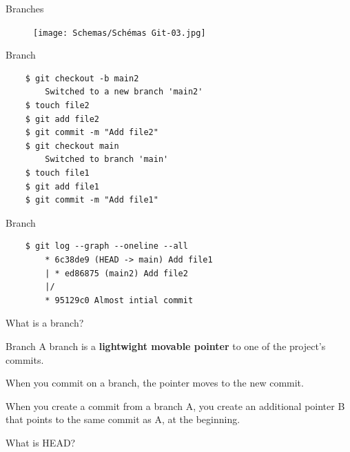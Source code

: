 \documentclass[10pt,aspectratio=169]{beamer}
\begin{document}
\begin{frame}[fragile]{Branches}
    \begin{figure}
        \texttt{[image: Schemas/Schémas Git-03.jpg]}
    \end{figure}
\end{frame}

\begin{frame}[fragile]{Branch}
    \begin{verbatim}
    $ git checkout -b main2
        Switched to a new branch 'main2'
    $ touch file2
    $ git add file2
    $ git commit -m "Add file2"
    $ git checkout main
        Switched to branch 'main'
    $ touch file1
    $ git add file1
    $ git commit -m "Add file1"
    \end{verbatim}
\end{frame}

\begin{frame}[fragile]{Branch}
    \begin{verbatim}
    $ git log --graph --oneline --all
        * 6c38de9 (HEAD -> main) Add file1
        | * ed86875 (main2) Add file2
        |/
        * 95129c0 Almost intial commit
    \end{verbatim}
\end{frame}


{
\begin{frame}
    What is a branch?
\end{frame}
}

\begin{frame}[fragile]{Branch}
    A branch is a \textbf{lightwight movable pointer} to one of the project's commits.

    When you commit on a branch, the pointer moves to the new commit.

    When you create a commit from a branch A, you create an additional pointer B that points to the same commit as A, at the beginning.
\end{frame}


{
\begin{frame}
    What is HEAD?
\end{frame}
}
\end{document}
